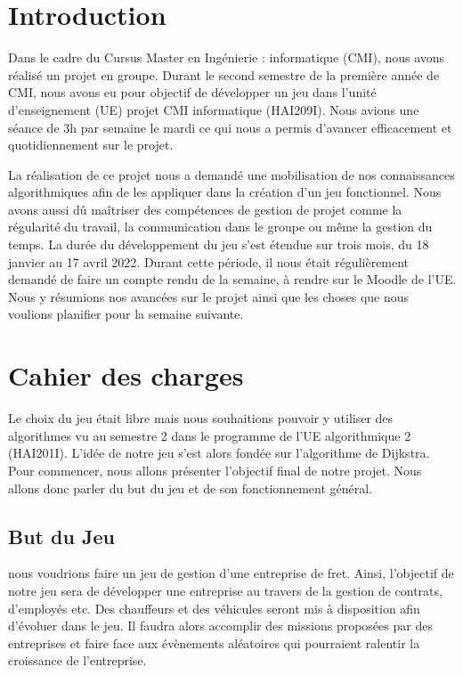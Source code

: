 \documentclass[a4paper, 12pt]{article}
\begin{document}
\newpage


\renewcommand*\contentsname{Sommaire}
\tableofcontents
\newpage
   \section*{Introduction}
      Dans le cadre du Cursus Master en Ingénierie : informatique (CMI), nous avons réalisé un projet en groupe. Durant le second semestre de la première année de CMI, nous avons eu pour objectif de développer un jeu dans l'unité d'enseignement (UE) projet CMI informatique (HAI209I). Nous avions une séance de 3h par semaine le mardi ce qui nous a permis d'avancer efficacement et quotidiennement sur le projet.
      
      La réalisation de ce projet nous a demandé une mobilisation de nos connaissances algorithmiques afin de les appliquer dans la création d'un jeu fonctionnel. Nous avons aussi dû maîtriser des compétences de gestion de projet comme la régularité du travail, la communication dans le groupe ou même la gestion du temps. La durée du développement du jeu s'est étendue sur trois mois, du 18 janvier au 17 avril 2022. Durant cette période, il nous était régulièrement demandé de faire un compte rendu de la semaine, à rendre sur le Moodle de l'UE. Nous y résumions nos avancées sur le projet ainsi que les choses que nous voulions planifier pour la semaine suivante.
      
      \newline
\section{Cahier des charges}
        Le choix du jeu était libre mais nous souhaitions pouvoir y utiliser des algorithmes vu au semestre 2 dans le programme de l'UE algorithmique 2 (HAI201I). L'idée de notre jeu s'est alors fondée sur l'algorithme de Dijkstra. Pour commencer, nous allons présenter l'objectif final de notre projet. Nous allons donc parler du but du jeu et de son fonctionnement général.
      \subsection{But du Jeu}
         nous voudrions faire un jeu de gestion d'une entreprise de fret. Ainsi, l'objectif de notre jeu sera de développer une entreprise au travers de la gestion de contrats, d'employés etc. Des chauffeurs et des véhicules seront mis à disposition afin d'évoluer dans le jeu. Il faudra alors accomplir des missions proposées par des entreprises et faire face aux évènements aléatoires qui pourraient ralentir la croissance de l'entreprise. 
\end{document}
